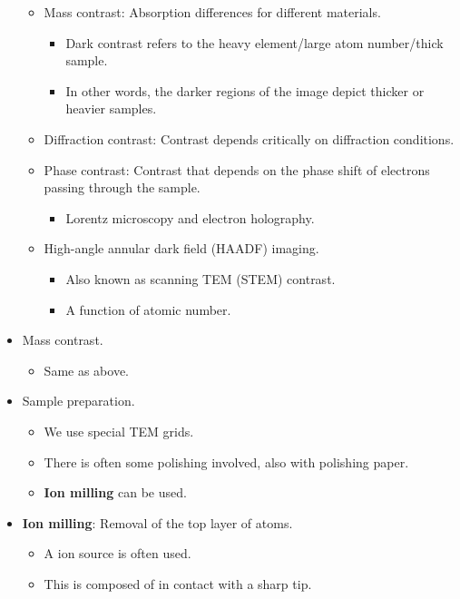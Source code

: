 \documentclass[../notes.tex]{subfiles}
\begin{document}
\begin{itemize}
\begin{itemize}
        \item Mass contrast: Absorption differences for different materials.
        \begin{itemize}
            \item Dark contrast refers to the heavy element/large atom number/thick sample.
            \item In other words, the darker regions of the image depict thicker or heavier samples.
        \end{itemize}
        \item Diffraction contrast: Contrast depends critically on diffraction conditions.
        \item Phase contrast: Contrast that depends on the phase shift of electrons passing through the sample.
        \begin{itemize}
            \item Lorentz microscopy and electron holography.
        \end{itemize}
        \item High-angle annular dark field (HAADF) imaging.
        \begin{itemize}
            \item Also known as scanning TEM (STEM) contrast.
            \item A function of atomic number.
        \end{itemize}
    \end{itemize}
    \item Mass contrast.
    \begin{itemize}
        \item Same as above.
    \end{itemize}
    \item Sample preparation.
    \begin{itemize}
        \item We use special TEM grids.
        \item There is often some polishing involved, also with polishing paper.
        \item \textbf{Ion milling} can be used.
    \end{itemize}
    \item \textbf{Ion milling}: Removal of the top layer of atoms.
    \begin{itemize}
        \item A  ion source is often used.
        \item This is composed of  in contact with a sharp  tip.

\end{itemize}
\end{itemize}
\end{document}

